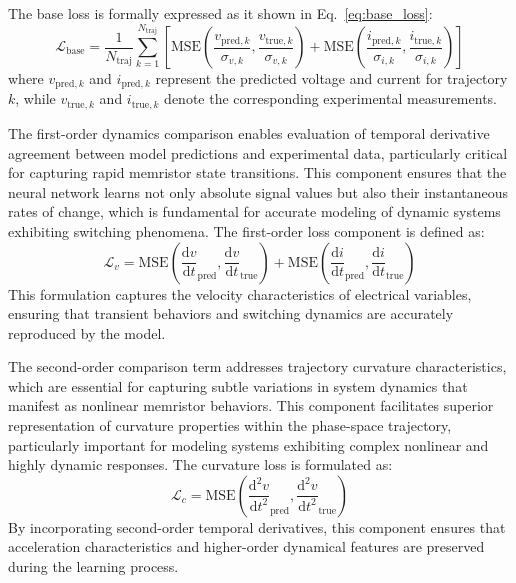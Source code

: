 \documentclass[11pt, oneside]{article}
\begin{document}
The base loss is formally expressed as it shown in Eq.~\eqref{eq:base_loss}:
\begin{equation}
    \mathcal{L}_{\mathrm{base}} = \frac{1}{N_{\text{traj}}} \sum_{k=1}^{N_{\text{traj}}} \left[\mathrm{MSE}\left(\frac{v_{\mathrm{pred},k}}{\sigma_{v,k}}, \frac{v_{\mathrm{true},k}}{\sigma_{v,k}}\right) +  \mathrm{MSE}\left(\frac{i_{\mathrm{pred},k}}{\sigma_{i,k}}, \frac{i_{\mathrm{true},k}}{\sigma_{i,k}}\right)\right]
    \label{eq:base_loss}
\end{equation}
where $v_{\mathrm{pred},k}$ and $i_{\mathrm{pred},k}$ represent the predicted voltage and current for trajectory $k$, while $v_{\mathrm{true},k}$ and $i_{\mathrm{true},k}$ denote the corresponding experimental measurements.

The first-order dynamics comparison enables evaluation of temporal derivative agreement between model predictions and experimental data, particularly critical for capturing rapid memristor state transitions. This component ensures that the neural network learns not only absolute signal values but also their instantaneous rates of change, which is fundamental for accurate modeling of dynamic systems exhibiting switching phenomena. The first-order loss component is defined as:
\begin{equation}
    \mathcal{L}_{v} = \mathrm{MSE}\left(\frac{\mathrm{d}v}{\mathrm{d}t}_{\mathrm{pred}}, \frac{\mathrm{d}v}{\mathrm{d}t}_{\mathrm{true}}\right) + \mathrm{MSE}\left(\frac{\mathrm{d}i}{\mathrm{d}t}_{\mathrm{pred}}, \frac{\mathrm{d}i}{\mathrm{d}t}_{\mathrm{true}}\right)
\end{equation}
This formulation captures the velocity characteristics of electrical variables, ensuring that transient behaviors and switching dynamics are accurately reproduced by the model.

The second-order comparison term addresses trajectory curvature characteristics, which are essential for capturing subtle variations in system dynamics that manifest as nonlinear memristor behaviors. This component facilitates superior representation of curvature properties within the phase-space trajectory, particularly important for modeling systems exhibiting complex nonlinear and highly dynamic responses. The curvature loss is formulated as:
\begin{equation}
    \mathcal{L}_{c} = \mathrm{MSE}\left(\frac{\mathrm{d}^2v}{\mathrm{d}t^2}_{\mathrm{pred}}, \frac{\mathrm{d}^2v}{\mathrm{d}t^2}_{\mathrm{true}}\right)
\end{equation}
By incorporating second-order temporal derivatives, this component ensures that acceleration characteristics and higher-order dynamical features are preserved during the learning process.
\end{document}
